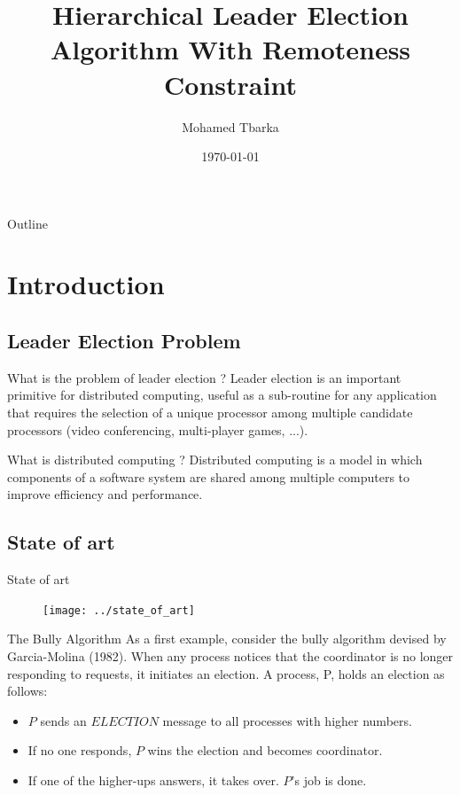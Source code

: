 \documentclass{beamer}
\title{Hierarchical Leader Election Algorithm With Remoteness Constraint}
\author{Mohamed Tbarka}
\date{\today}
\begin{document}

\frame{\titlepage}

\section[Outline]{}
\begin{frame}{Outline}

  \tableofcontents
\end{frame}

\section{Introduction}
\subsection{Leader Election Problem}
\begin{frame}{What is the problem of leader election ?}
Leader election is an important primitive for distributed computing, useful as a sub-routine for any application that requires the selection of a unique processor among multiple candidate processors (video conferencing, multi-player games, ...).
\end{frame}

\begin{frame}{What is distributed computing ?}
Distributed computing is a model in which components of a software system are shared among multiple computers to improve efficiency and performance.
\end{frame}

\subsection{State of art}
\begin{frame}{State of art}
	\begin{figure}
		\centering
		\texttt{[image: ../state\_of\_art]}
		\caption{}
		\label{fig:stateofart}
	\end{figure}
\end{frame}
\iffalse
\begin{frame}{The Bully Algorithm}
  As a first example, consider the bully algorithm devised by Garcia-Molina (1982). When any process notices that the coordinator is no longer responding to requests, it initiates an election. A process, P, holds an election as follows:
  \pause
  \begin{itemize}
    \item <2-> $P$ sends an $ELECTION$ message to all processes with higher numbers.
    \item <3-> If no one responds, $P$ wins the election and becomes coordinator.
    \item <4-> If one of the higher-ups answers, it takes over. $P$'s job is done.
  \end{itemize}
\end{frame}
\end{document}
